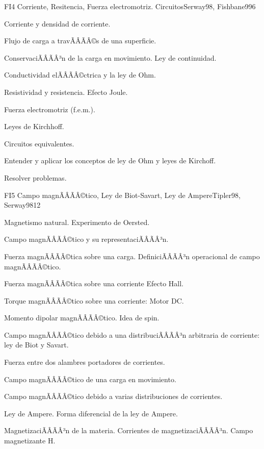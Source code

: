 \begin{sumilla}
\begin{unit}{FI4 Corriente, Resitencia, Fuerza electromotriz. Circuitos}{Serway98, Fishbane99}{6}
   \begin{topicos}
         \item  Corriente y densidad de corriente.
	 \item  Flujo de carga a travÃÂÃÂ©s de una superficie.
         \item  ConservaciÃÂÃÂ³n de la carga en movimiento. Ley de continuidad.
	 \item  Conductividad elÃÂÃÂ©ctrica y la ley de Ohm.
         \item  Resistividad y resistencia.  Efecto Joule.
	 \item  Fuerza electromotriz (f.e.m.).
         \item  Leyes de Kirchhoff.
	 \item  Circuitos equivalentes.
   \end{topicos}

   \begin{objetivos}
         \item  Entender y aplicar los conceptos de ley de Ohm y leyes de Kirchoff.
         \item  Resolver problemas.
   \end{objetivos}
\end{unit}

\begin{unit}{FI5 Campo magnÃÂÃÂ©tico, Ley de Biot-Savart, Ley de Ampere}{Tipler98, Serway98}{12}
   \begin{topicos}
         \item  Magnetismo natural. Experimento de Oersted.
	 \item  Campo magnÃÂÃÂ©tico y su representaciÃÂÃÂ³n.
         \item  Fuerza magnÃÂÃÂ©tica sobre una carga. DefiniciÃÂÃÂ³n operacional de campo magnÃÂÃÂ©tico.
	 \item  Fuerza magnÃÂÃÂ©tica sobre una corriente  Efecto Hall.
         \item  Torque magnÃÂÃÂ©tico sobre una corriente: Motor DC.
	 \item  Momento dipolar magnÃÂÃÂ©tico.  Idea de spin.
         \item  Campo magnÃÂÃÂ©tico debido a una distribuciÃÂÃÂ³n arbitraria de corriente:  ley de Biot y Savart.
	 \item  Fuerza entre dos alambres portadores de corrientes.
         \item  Campo magnÃÂÃÂ©tico de una carga en movimiento.
	 \item  Campo magnÃÂÃÂ©tico debido a varias distribuciones de corrientes.
         \item  Ley de Ampere.  Forma diferencial de la ley de Ampere.
	 \item  MagnetizaciÃÂÃÂ³n de la materia. Corrientes de magnetizaciÃÂÃÂ³n. Campo magnetizante H.
   \end{topicos}


\end{unit}
\end{sumilla}

